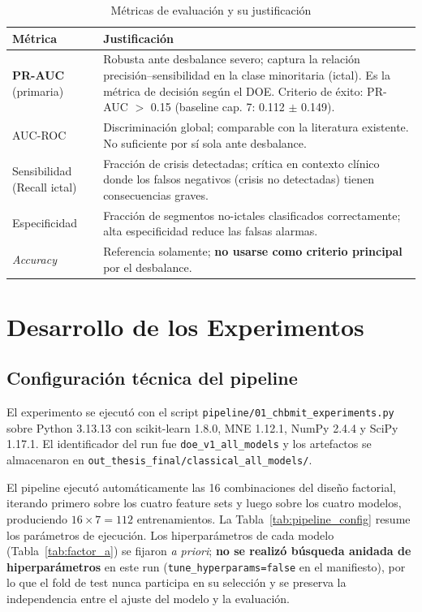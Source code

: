 \documentclass[12pt,a4paper]{article}
\begin{document}
\begin{table}[H]
\centering
\caption{Métricas de evaluación y su justificación}
\label{tab:metricas}
\renewcommand{\arraystretch}{1.25}
\begin{tabularx}{\textwidth}{p{3.2cm} >{\RaggedRight\arraybackslash}X}
\toprule
\textbf{Métrica} & \textbf{Justificación} \\
\midrule
\textbf{PR-AUC} (primaria) &
  Robusta ante desbalance severo; captura la relación precisión--sensibilidad en la clase
  minoritaria (ictal). Es la métrica de decisión según el DOE. Criterio de éxito:
  PR-AUC $>$ 0.15 (baseline cap. 7: 0.112 $\pm$ 0.149). \\
AUC-ROC &
  Discriminación global; comparable con la literatura existente. No suficiente por
  sí sola ante desbalance. \\
Sensibilidad (Recall ictal) &
  Fracción de crisis detectadas; crítica en contexto clínico donde los falsos negativos
  (crisis no detectadas) tienen consecuencias graves. \\
Especificidad &
  Fracción de segmentos no-ictales clasificados correctamente; alta especificidad
  reduce las falsas alarmas. \\
\textit{Accuracy} &
  Referencia solamente; \textbf{no usarse como criterio principal} por el desbalance. \\
\bottomrule
\end{tabularx}
\end{table}

\section{Desarrollo de los Experimentos}

\subsection{Configuración técnica del pipeline}

El experimento se ejecutó con el script \texttt{pipeline/01\_chbmit\_experiments.py} sobre Python
3.13.13 con scikit-learn 1.8.0, MNE 1.12.1, NumPy 2.4.4 y SciPy 1.17.1.
El identificador del run fue \texttt{doe\_v1\_all\_models} y los artefactos se
almacenaron en \texttt{out\_thesis\_final/classical\_all\_models/}.

El pipeline ejecutó automáticamente las 16 combinaciones del diseño factorial, iterando
primero sobre los cuatro feature sets y luego sobre los cuatro modelos, produciendo
$16 \times 7 = 112$ entrenamientos. La Tabla~\ref{tab:pipeline_config} resume los
parámetros de ejecución. Los hiperparámetros de cada modelo (Tabla~\ref{tab:factor_a})
se fijaron \textit{a priori}; \textbf{no se realizó búsqueda anidada de hiperparámetros}
en este run (\texttt{tune\_hyperparams=false} en el manifiesto), por lo que el fold
de test nunca participa en su selección y se preserva la independencia entre el
ajuste del modelo y la evaluación.
\end{document}
